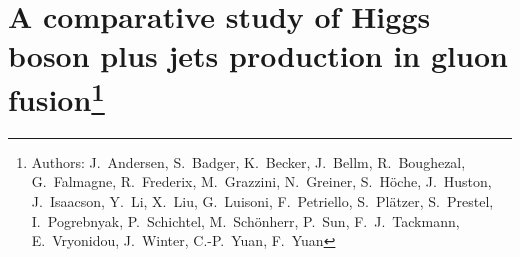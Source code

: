 \documentclass[11pt]{cernrep}
\begin{document}
\section{A comparative study of Higgs boson plus jets production in
  gluon fusion\protect\footnote{Authors: %
    J.~Andersen, S.~Badger, K.~Becker, J.~Bellm, R.~Boughezal,
    G.~Falmagne, R.~Frederix, M.~Grazzini, N.~Greiner,
    S.~H\"oche, J.~Huston, J.~Isaacson, Y.~Li, X.~Liu, G.~Luisoni,
    F.~Petriello, S.~Pl\"atzer, S.~Prestel, I.~Pogrebnyak,
    P.~Schichtel, M.~Sch\"onherr, P.~Sun, F.~J.~Tackmann, E.~Vryonidou,
    J.~Winter, C.-P.~Yuan, F.~Yuan}}







\end{document}
